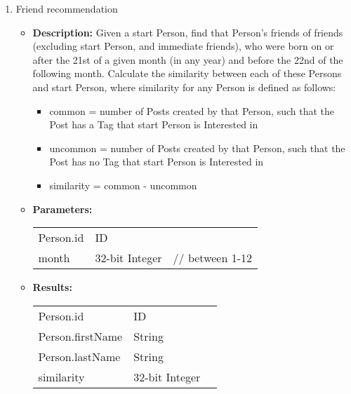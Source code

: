 {\begin{enumerate}
    \item Friend recommendation
        \begin{itemize}
            \item \textbf{Description:}
                Given a start Person, find that Person's friends of friends
                (excluding start Person, and immediate friends), who were born on
                or after the 21st of a given month (in any year) and before the
                22nd of the following month.  Calculate the similarity between each
                of these Persons and start Person, where similarity for any Person
                is defined as follows:
                \begin{itemize}
                    \item common = number of Posts created by that Person, such that the Post has a Tag that start Person is Interested in
                    \item uncommon = number of Posts created by that Person, such that the Post has no Tag that start Person is Interested in
                    \item similarity = common - uncommon
                \end{itemize}
            \item \textbf{Parameters:} \\
                \begin{tabular}{lll}
                    Person.id 	 						& ID & \parbox[t]{20cm}{\par \strut} \\
                    month 		 						& 32-bit Integer & \parbox[t]{20cm}{// between 1-12\par \strut} \\
                \end{tabular}
            \item \textbf{Results:} \\
                \begin{tabular}{lll}
                    Person.id 	 						& ID & \parbox[t]{20cm}{\par \strut} \\
                    Person.firstName 	 				& String & \parbox[t]{20cm}{\par \strut} \\
                    Person.lastName 	 				& String & \parbox[t]{20cm}{\par \strut} \\
                    similarity 	 						& 32-bit Integer & \parbox[t]{20cm}{\par \strut} \\

\end{tabular}
\end{itemize}
\end{enumerate}}
